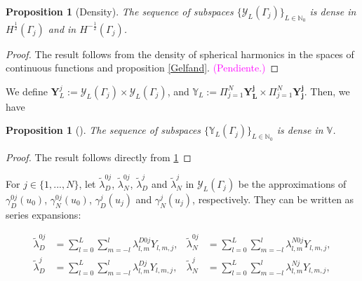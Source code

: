 \documentclass[]{article}%
\newtheorem{proposition}[theorem]{Proposition}
\begin{document}
\begin{proposition}[Density]\label{density1}
The sequence of subspaces $\lbrace \mathcal{Y}_L \left(\Gamma_j \right) \rbrace_{L \in \mathbb{N}_0} $ is dense in $H^{\frac{1}{2}}(\Gamma_j)$ and in $H^{-\frac{1}{2}}(\Gamma_j)$.
\end{proposition}

\begin{proof}
The result follows from the density of spherical harmonics in the spaces of continuous functions \cite[Section 2.8]{AtkinsonHan2012} and proposition \ref{Gelfand}. \textcolor{magenta}{(Pendiente.)}
\end{proof}

We define $\mathbf{Y}_L^j:= \mathcal{Y}_L \left(\Gamma_j \right) \times \mathcal{Y}_L \left(\Gamma_j \right)$, and $ \mathbb{Y}_L:= \Pi_{j=1}^{N} \mathbf{Y_L^j} \times \Pi_{j=1}^{N} \mathbf{Y_j^j}$. Then, we have

\begin{proposition}[]\label{density2}
The sequence of subspaces $\lbrace \mathbb{Y}_L \left(\Gamma_j \right) \rbrace_{L \in \mathbb{N}_0} $ is dense in $\mathbb{V}$.
\end{proposition}

\begin{proof}
The result follows directly from \ref{density1}
\end{proof}

For $j \in \lbrace 1, ..., N \rbrace$, let $\tilde{\lambda}_D^{0j}$, $\tilde{\lambda}_N^{0j}$, $\tilde{\lambda}_D^{j}$ and $\tilde{\lambda}_N^{j}$ in $\mathcal{Y}_L(\Gamma_j)$ be the approximations of $\gamma_D^{0j}\left(u_0\right)$, $\gamma_N^{0j}\left(u_0\right)$, $\gamma_D^{j}\left(u_j\right)$ and $\gamma_N^{j}\left(u_j\right)$, respectively.  They can be written as series expansions:

\begin{subequations}
\begin{align}
\tilde{\lambda}_D^{0j}&=
\sum_{l=0}^{L}  \sum_{m=-l}^l \lambda_{l,m}^{D0j}  Y_{l,m,j}, & \tilde{\lambda}_N^{0j}&=
\sum_{l=0}^{L}  \sum_{m=-l}^l \lambda_{l,m}^{N0j}  Y_{l,m,j}, \label{tracediscretization1}\\
\tilde{\lambda}_D^{j}&=
\sum_{l=0}^{L}  \sum_{m=-l}^l \lambda_{l,m}^{Dj}  Y_{l,m,j},& \tilde{\lambda}_N^{j}&=
\sum_{l=0}^{L}  \sum_{m=-l}^l \lambda_{l,m}^{Nj}  Y_{l,m,j}, \label{tracediscretization2}
\end{align}
\end{subequations}
\end{document}
